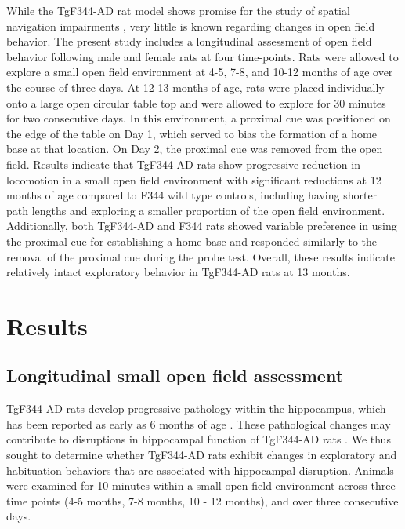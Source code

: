 \documentclass[fleqn,10pt]{wlscirep}
\begin{document}
While the TgF344-AD rat model shows promise for the study of spatial navigation impairments \cite{berkowitz_progressive_2018}, very little is known regarding changes in open field behavior.  The present study includes a longitudinal assessment of open field behavior following male and female rats at four time-points. Rats were allowed to explore a small open field environment at 4-5, 7-8, and 10-12 months of age over the course of three days. At 12-13 months of age, rats were placed individually onto a large open circular table top and were allowed to explore for 30 minutes for two consecutive days. In this environment, a proximal cue was positioned on the edge of the table on Day 1, which served to bias the formation of a home base at that location. On Day 2, the proximal cue was removed from the open field. Results indicate that TgF344-AD rats show progressive reduction in locomotion in a small open field environment with significant reductions at 12 months of age compared to F344 wild type controls, including having shorter path lengths and exploring a smaller proportion of the open field environment. Additionally, both TgF344-AD and F344 rats showed variable preference in using the proximal cue for establishing a home base and responded similarly to the removal of the proximal cue during the probe test. Overall, these results indicate relatively intact exploratory behavior in TgF344-AD rats at 13 months.   

\section*{Results}

\subsection*{Longitudinal small open field assessment}

TgF344-AD rats develop progressive pathology within the hippocampus, which has been reported as early as 6 months of age \cite{cohen_transgenic_2013}. These pathological changes may contribute to disruptions in hippocampal function of TgF344-AD rats \cite{stoiljkovic_altered_2018}. We thus sought to determine whether TgF344-AD rats exhibit changes in exploratory and habituation behaviors that are associated with hippocampal disruption. Animals were examined for 10 minutes within a small open field environment across three time points (4-5 months, 7-8 months, 10 - 12 months), and over three consecutive days. 
\end{document}
